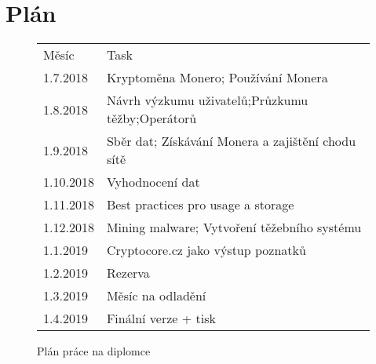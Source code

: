 \documentclass[
  printed, %
  table,   %
  nolof,     %
  nolot,     %
           oneside, color
]{fithesis3}
\begin{document}
\chapter{Plán}

\begin{figure}[H]
\center
\begin{tabular}{ll}
Měsíc     & Task                                              \\
1.7.2018  & Kryptoměna Monero; Používání Monera               \\
1.8.2018  & Návrh výzkumu uživatelů;Průzkumu těžby;Operátorů  \\
1.9.2018  & Sběr dat; Získávání Monera a zajištění chodu sítě \\
1.10.2018 & Vyhodnocení dat                                   \\
1.11.2018 & Best practices pro usage a storage                \\
1.12.2018 & Mining malware; Vytvoření těžebního systému       \\
1.1.2019  & Cryptocore.cz jako výstup poznatků                \\
1.2.2019  & Rezerva                                           \\
1.3.2019  & Měsíc na odladění                                 \\
1.4.2019  & Finální verze + tisk                             
\end{tabular}
\caption{Plán práce na diplomce}
\label{ssme-thesis-plan}
\end{figure}



\printbibliography[heading=bibintoc]

\end{document}
